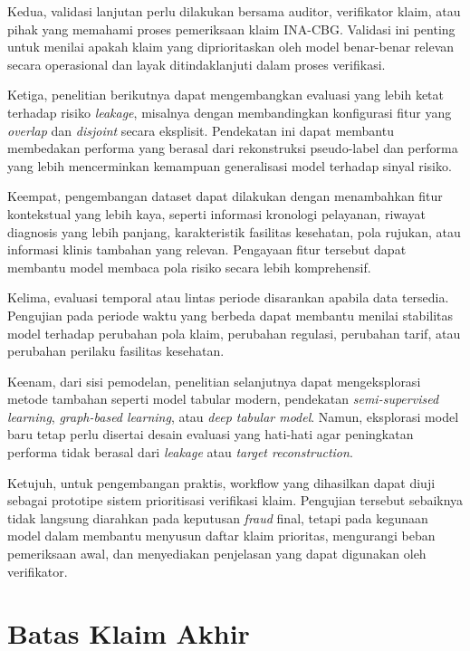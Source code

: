 Kedua, validasi lanjutan perlu dilakukan bersama auditor, verifikator klaim, atau pihak yang memahami proses pemeriksaan klaim INA-CBG. Validasi ini penting untuk menilai apakah klaim yang diprioritaskan oleh model benar-benar relevan secara operasional dan layak ditindaklanjuti dalam proses verifikasi.

Ketiga, penelitian berikutnya dapat mengembangkan evaluasi yang lebih ketat terhadap risiko \emph{leakage}, misalnya dengan membandingkan konfigurasi fitur yang \emph{overlap} dan \emph{disjoint} secara eksplisit. Pendekatan ini dapat membantu membedakan performa yang berasal dari rekonstruksi pseudo-label dan performa yang lebih mencerminkan kemampuan generalisasi model terhadap sinyal risiko.

Keempat, pengembangan dataset dapat dilakukan dengan menambahkan fitur kontekstual yang lebih kaya, seperti informasi kronologi pelayanan, riwayat diagnosis yang lebih panjang, karakteristik fasilitas kesehatan, pola rujukan, atau informasi klinis tambahan yang relevan. Pengayaan fitur tersebut dapat membantu model membaca pola risiko secara lebih komprehensif.

Kelima, evaluasi temporal atau lintas periode disarankan apabila data tersedia. Pengujian pada periode waktu yang berbeda dapat membantu menilai stabilitas model terhadap perubahan pola klaim, perubahan regulasi, perubahan tarif, atau perubahan perilaku fasilitas kesehatan.

Keenam, dari sisi pemodelan, penelitian selanjutnya dapat mengeksplorasi metode tambahan seperti model tabular modern, pendekatan \emph{semi-supervised learning}, \emph{graph-based learning}, atau \emph{deep tabular model}. Namun, eksplorasi model baru tetap perlu disertai desain evaluasi yang hati-hati agar peningkatan performa tidak berasal dari \emph{leakage} atau \emph{target reconstruction}.

Ketujuh, untuk pengembangan praktis, workflow yang dihasilkan dapat diuji sebagai prototipe sistem prioritisasi verifikasi klaim. Pengujian tersebut sebaiknya tidak langsung diarahkan pada keputusan \emph{fraud} final, tetapi pada kegunaan model dalam membantu menyusun daftar klaim prioritas, mengurangi beban pemeriksaan awal, dan menyediakan penjelasan yang dapat digunakan oleh verifikator.

\section{Batas Klaim Akhir}\label{batas-klaim-akhir}

